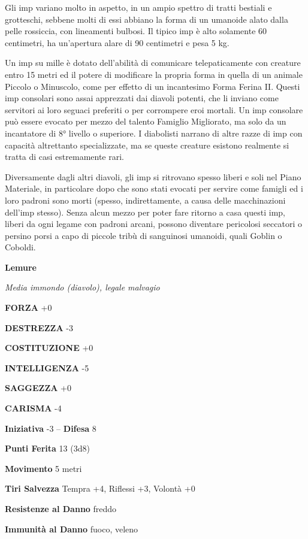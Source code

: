 \begin{multicols}{2}
Gli imp variano molto in aspetto, in un ampio spettro di tratti bestiali e grotteschi, sebbene molti di essi abbiano la forma di un umanoide alato dalla pelle rossiccia, con lineamenti bulbosi. Il tipico imp è alto solamente 60 centimetri, ha un'apertura alare di 90 centimetri e pesa 5 kg.

Un imp su mille è dotato dell'abilità di comunicare telepaticamente con creature entro 15 metri ed il potere di modificare la propria forma in quella di un animale Piccolo o Minuscolo, come per effetto di un incantesimo Forma Ferina II. Questi imp consolari sono assai apprezzati dai diavoli potenti, che li inviano come servitori ai loro seguaci preferiti o per corrompere eroi mortali. Un imp consolare può essere evocato per mezzo del talento Famiglio Migliorato, ma solo da un incantatore di 8° livello o superiore. I diabolisti narrano di altre razze di imp con capacità altrettanto specializzate, ma se queste creature esistono realmente si tratta di casi estremamente rari.

Diversamente dagli altri diavoli, gli imp si ritrovano spesso liberi e soli nel Piano Materiale, in particolare dopo che sono stati evocati per servire come famigli ed i loro padroni sono morti (spesso, indirettamente, a causa delle macchinazioni dell'imp stesso). Senza alcun mezzo per poter fare ritorno a casa questi imp, liberi da ogni legame con padroni arcani, possono diventare pericolosi seccatori o persino porsi a capo di piccole tribù di sanguinosi umanoidi, quali Goblin o Coboldi.


\medskip{}\textbf{Lemure}

\textit{Media immondo (diavolo), legale malvagio}

\textbf{FORZA} +0

\textbf{DESTREZZA} -3

\textbf{COSTITUZIONE} +0

\textbf{INTELLIGENZA} -5

\textbf{SAGGEZZA} +0

\textbf{CARISMA} -4

\textbf{Iniziativa} -3 -- \textbf{Difesa} 8

\textbf{Punti Ferita} 13 (3d8)

\textbf{Movimento} 5 metri

\textbf{Tiri Salvezza} Tempra +4, Riflessi +3, Volontà +0

\textbf{Resistenze al Danno} freddo

\textbf{Immunità al Danno} fuoco, veleno


\end{multicols}
